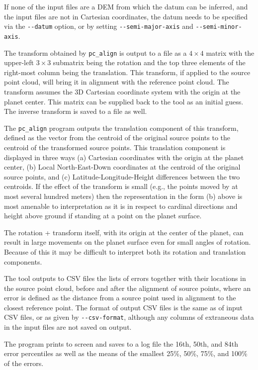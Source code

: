 If none of the input files are a DEM from which the datum can be
inferred, and the input files are not in Cartesian coordinates, the
datum needs to be specified via the \texttt{-\/-datum} option, or by
setting \texttt{-\/-semi-major-axis} and \texttt{-\/-semi-minor-axis}.

The transform obtained by \texttt{pc\_align} is output to a file as a
$4\times 4$ matrix with the upper-left $3\times 3$ submatrix being the
rotation and the top three elements of the right-most column being the
translation. This transform, if applied to the source point cloud, will
bring it in alignment with the reference point cloud. The transform
assumes the 3D Cartesian coordinate system with the origin at the planet
center. This matrix can be supplied back to the tool as an initial
guess. The inverse transform is saved to a file as well.

The \texttt{pc\_align} program outputs the translation component of this
transform, defined as the vector from the centroid of the original
source points to the centroid of the transformed source points. This
translation component is displayed in three ways (a) Cartesian
coordinates with the origin at the planet center, (b) Local
North-East-Down coordinates at the centroid of the original source
points, and (c) Latitude-Longitude-Height differences between the two
centroids. If the effect of the transform is small (e.g., the points
moved by at most several hundred meters) then the representation in the
form (b) above is most amenable to interpretation as it is in respect
to cardinal directions and height above ground if standing at a point on
the planet surface.

The rotation + transform itself, with its origin at the center of the planet,
can result in large movements on the planet surface even for small angles
of rotation. Because of this it may be difficult to interpret both its rotation
and translation components.

The tool outputs to CSV files the lists of errors together with their
locations in the source point cloud, before and after the alignment of
source points, where an error is defined as the distance from a source
point used in alignment to the closest reference point. The format of
output CSV files is the same as of input CSV files, or as given by
\texttt{-\/-csv-format}, although any columns of extraneous data in the
input files are not saved on output.

The program prints to screen and saves to a log file the 16th, 50th, and
84th error percentiles as well as the means of the smallest 25\%, 50\%,
75\%, and 100\% of the errors.

